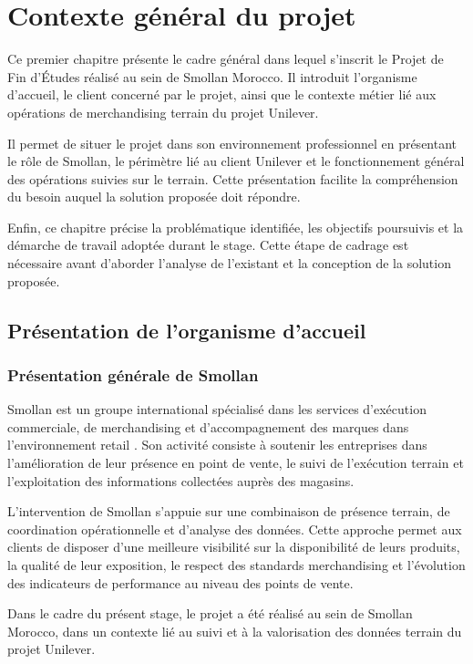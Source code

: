 \chapter{Contexte général du projet}

Ce premier chapitre présente le cadre général dans lequel s’inscrit le Projet de Fin d’Études réalisé au sein de Smollan Morocco. Il introduit l’organisme d’accueil, le client concerné par le projet, ainsi que le contexte métier lié aux opérations de merchandising terrain du projet Unilever.

Il permet de situer le projet dans son environnement professionnel en présentant le rôle de Smollan, le périmètre lié au client Unilever et le fonctionnement général des opérations suivies sur le terrain. Cette présentation facilite la compréhension du besoin auquel la solution proposée doit répondre.

Enfin, ce chapitre précise la problématique identifiée, les objectifs poursuivis et la démarche de travail adoptée durant le stage. Cette étape de cadrage est nécessaire avant d’aborder l’analyse de l’existant et la conception de la solution proposée.

\section{Présentation de l’organisme d’accueil}

\subsection{Présentation générale de Smollan}

Smollan est un groupe international spécialisé dans les services d’exécution commerciale, de merchandising et d’accompagnement des marques dans l’environnement retail \cite{smollan}. Son activité consiste à soutenir les entreprises dans l’amélioration de leur présence en point de vente, le suivi de l’exécution terrain et l’exploitation des informations collectées auprès des magasins.

L’intervention de Smollan s’appuie sur une combinaison de présence terrain, de coordination opérationnelle et d’analyse des données. Cette approche permet aux clients de disposer d’une meilleure visibilité sur la disponibilité de leurs produits, la qualité de leur exposition, le respect des standards merchandising et l’évolution des indicateurs de performance au niveau des points de vente.

Dans le cadre du présent stage, le projet a été réalisé au sein de Smollan Morocco, dans un contexte lié au suivi et à la valorisation des données terrain du projet Unilever.

